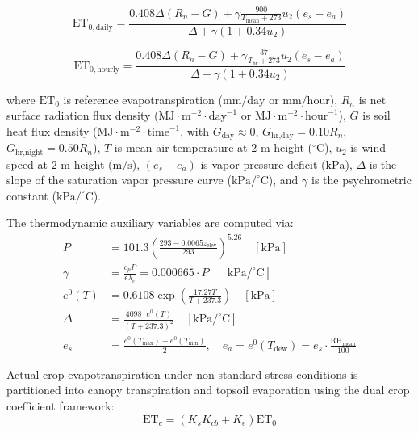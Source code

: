 \documentclass[sn-mathphys-num,Numbered]{sn-jnl}
\begin{document}
\begin{equation}
\mathrm{ET}_{0, \text{daily}} = \frac{0.408 \Delta (R_n - G) + \gamma \frac{900}{T_{\text{mean}} + 273} u_2 (e_s - e_a)}{\Delta + \gamma (1 + 0.34 u_2)} \label{eq:et0_daily}
\end{equation}

\begin{equation}
\mathrm{ET}_{0, \text{hourly}} = \frac{0.408 \Delta (R_n - G) + \gamma \frac{37}{T_{\text{hr}} + 273} u_2 (e_s - e_a)}{\Delta + \gamma (1 + 0.34 u_2)} \label{eq:et0_hourly}
\end{equation}

where $\mathrm{ET}_{0}$ is reference evapotranspiration ($\text{mm/day}$ or $\text{mm/hour}$), $R_n$ is net surface radiation flux density ($\text{MJ}\cdot\text{m}^{-2}\cdot\text{day}^{-1}$ or $\text{MJ}\cdot\text{m}^{-2}\cdot\text{hour}^{-1}$), $G$ is soil heat flux density ($\text{MJ}\cdot\text{m}^{-2}\cdot\text{time}^{-1}$, with $G_{\text{day}} \approx 0$, $G_{\text{hr,day}} = 0.10 R_n$, $G_{\text{hr,night}} = 0.50 R_n$), $T$ is mean air temperature at $2\text{ m}$ height ($^\circ\text{C}$), $u_2$ is wind speed at $2\text{ m}$ height ($\text{m/s}$), $(e_s - e_a)$ is vapor pressure deficit ($\text{kPa}$), $\Delta$ is the slope of the saturation vapor pressure curve ($\text{kPa}/^\circ\text{C}$), and $\gamma$ is the psychrometric constant ($\text{kPa}/^\circ\text{C}$).

The thermodynamic auxiliary variables are computed via:
\begin{align}
P &= 101.3 \left( \frac{293 - 0.0065 z_{\text{elev}}}{293} \right)^{5.26} \quad [\text{kPa}] \label{eq:pressure} \\
\gamma &= \frac{c_p P}{\epsilon \lambda_v} = 0.000665 \cdot P \quad [\text{kPa}/^\circ\text{C}] \label{eq:gamma} \\
e^0(T) &= 0.6108 \exp\left( \frac{17.27 T}{T + 237.3} \right) \quad [\text{kPa}] \label{eq:sat_vp} \\
\Delta &= \frac{4098 \cdot e^0(T)}{(T + 237.3)^2} \quad [\text{kPa}/^\circ\text{C}] \label{eq:delta} \\
e_s &= \frac{e^0(T_{\max}) + e^0(T_{\min})}{2}, \quad e_a = e^0(T_{\text{dew}}) = e_s \cdot \frac{\mathrm{RH}_{\text{mean}}}{100} \label{eq:act_vp}
\end{align}

Actual crop evapotranspiration under non-standard stress conditions is partitioned into canopy transpiration and topsoil evaporation using the dual crop coefficient framework:
\begin{equation}
\mathrm{ET}_c = \left( K_s K_{cb} + K_e \right) \mathrm{ET}_0 \label{eq:etc_dual}
\end{equation}
\end{document}
